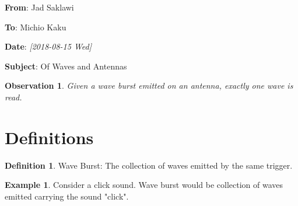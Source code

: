 \documentclass[11pt]{article}
\author{Jad Saklawi}
\date{\today}
\title{}
\begin{document}
\newtheorem*{observation}{Observation}
\theoremstyle{definition}
\newtheorem{definition}{Definition}[section]

\theoremstyle{example}
\newtheorem{example}{Example}[section]

\begin{flushleft}
\textbf{From}: Jad Saklawi \par
\textbf{To}: Michio Kaku \par
\textbf{Date}: \textit{[2018-08-15 Wed]} \par
\textbf{Subject}: Of Waves and Antennas\\
\end{flushleft}



\begin{observation}
Given a wave burst emitted on an antenna, exactly one wave is read.
\end{observation}
\newpage
\appendix
\section{Definitions}
\label{sec:orgheadline1}
\begin{definition}{Wave Burst:}
The collection of waves emitted by the same trigger.
\end{definition}
\begin{example}
Consider a click sound. Wave burst would be collection of waves emitted carrying the sound "click".
\end{example}
\end{document}
